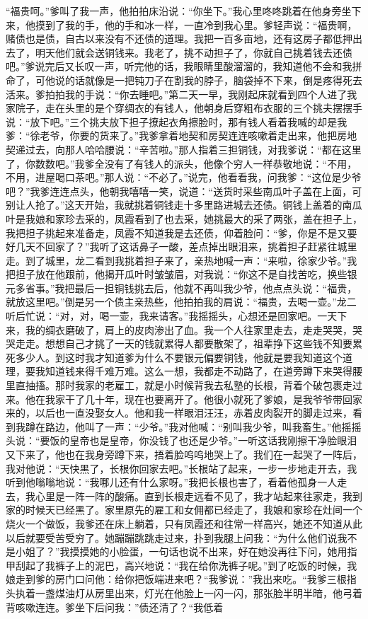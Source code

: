 \documentclass[12pt,UTF8]{ctexbook}
\begin{document}
“福贵呵。”爹叫了我一声，他拍拍床沿说：“你坐下。”我心里咚咚跳着在他身旁坐下来，他摸到了我的手，他的手和冰一样，一直冷到我心里。爹轻声说：“福贵啊，赌债也是债，自古以来没有不还债的道理。我把一百多亩地，还有这房子都低押出去了，明天他们就会送铜钱来。我老了，挑不动担子了，你就自己挑着钱去还债吧。”爹说完后又长叹一声，听完他的话，我眼睛里酸溜溜的，我知道他不会和我拼命了，可他说的话就像是一把钝刀子在割我的脖子，脑袋掉不下来，倒是疼得死去活来。爹拍拍我的手说：“你去睡吧。”第二天一早，我刚起床就看到四个人进了我家院子，走在头里的是个穿绸衣的有钱人，他朝身后穿粗布衣服的三个挑夫摆摆手说：“放下吧。”三个挑夫放下担子撩起衣角擦脸时，那有钱人看着我喊的却是我爹：“徐老爷，你要的货来了。”我爹拿着地契和房契连连咳嗽着走出来，他把房地契递过去，向那人哈哈腰说：“辛苦啦。”那人指着三担铜钱，对我爹说：“都在这里了，你数数吧。”我爹全没有了有钱人的派头，他像个穷人一样恭敬地说：“不用，不用，进屋喝口茶吧。”那人说：“不必了。”说完，他看看我，问我爹：“这位是少爷吧？”我爹连连点头，他朝我嘻嘻一笑，说道：“送货时采些南瓜叶子盖在上面，可别让人抢了。”这天开始，我就挑着铜钱走十多里路进城去还债。铜钱上盖着的南瓜叶是我娘和家珍去采的，凤霞看到了也去采，她挑最大的采了两张，盖在担子上，我把担子挑起来准备走，凤霞不知道我是去还债，仰着脸问：“爹，你是不是又要好几天不回家了？”我听了这话鼻子一酸，差点掉出眼泪来，挑着担子赶紧往城里走。到了城里，龙二看到我挑着担子来了，亲热地喊一声：“来啦，徐家少爷。”我把担子放在他跟前，他揭开瓜叶时皱皱眉，对我说：“你这不是自找苦吃，换些银元多省事。”我把最后一担铜钱挑去后，他就不再叫我少爷，他点点头说：“福贵，就放这里吧。”倒是另一个债主亲热些，他拍拍我的肩说：“福贵，去喝一壶。”龙二听后忙说：“对，对，喝一壶，我来请客。”我摇摇头，心想还是回家吧。一天下来，我的绸衣磨破了，肩上的皮肉渗出了血。我一个人往家里走去，走走哭哭，哭哭走走。想想自己才挑了一天的钱就累得人都要散架了，祖辈挣下这些钱不知要累死多少人。到这时我才知道爹为什么不要银元偏要铜钱，他就是要我知道这个道理，要我知道钱来得千难万难。这么一想，我都走不动路了，在道旁蹲下来哭得腰里直抽搐。那时我家的老雇工，就是小时候背我去私塾的长根，背着个破包裹走过来。他在我家干了几十年，现在也要离开了。他很小就死了爹娘，是我爷爷带回家来的，以后也一直没娶女人。他和我一样眼泪汪汪，赤着皮肉裂开的脚走过来，看到我蹲在路边，他叫了一声：“少爷。”我对他喊：“别叫我少爷，叫我畜生。”他摇摇头说：“要饭的皇帝也是皇帝，你没钱了也还是少爷。”一听这话我刚擦干净脸眼泪又下来了，他也在我身旁蹲下来，捂着脸呜呜地哭上了。我们在一起哭了一阵后，我对他说：“天快黑了，长根你回家去吧。”长根站了起来，一步一步地走开去，我听到他嗡嗡地说：“我哪儿还有什么家呀。”我把长根也害了，看着他孤身一人走去，我心里是一阵一阵的酸痛。直到长根走远看不见了，我才站起来往家走，我到家的时候天已经黑了。家里原先的雇工和女佣都已经走了，我娘和家珍在灶间一个烧火一个做饭，我爹还在床上躺着，只有凤霞还和往常一样高兴，她还不知道从此以后就要受苦受穷了。她蹦蹦跳跳走过来，扑到我腿上问我：“为什么他们说我不是小姐了？”我摸摸她的小脸蛋，一句话也说不出来，好在她没再往下问，她用指甲刮起了我裤子上的泥巴，高兴地说：“我在给你洗裤子呢。”到了吃饭的时候，我娘走到爹的房门口问他：给你把饭端进来吧？“我爹说：”我出来吃。“我爹三根指头执着一盏煤油灯从房里出来，灯光在他脸上一闪一闪，那张脸半明半暗，他弓着背咳嗽连连。爹坐下后问我：”债还清了？“我低着
\end{document}
